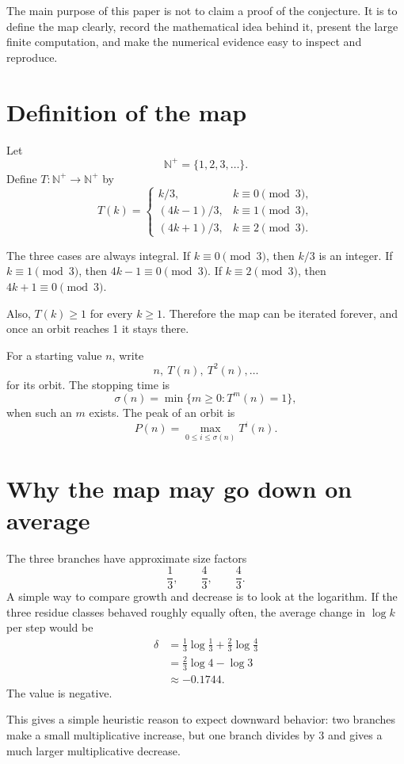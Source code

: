 \documentclass[11pt]{article}
\begin{document}
The main purpose of this paper is not to claim a proof of the conjecture. It is to define the map clearly, record the mathematical idea behind it, present the large finite computation, and make the numerical evidence easy to inspect and reproduce.

\section{Definition of the map}
Let
\[
\mathbb N^+=\{1,2,3,\ldots\}.
\]
Define $T:\mathbb N^+\to\mathbb N^+$ by
\begin{equation}
T(k)=
\begin{cases}
 k/3, & k\equiv0\pmod3,\\[3pt]
 (4k-1)/3, & k\equiv1\pmod3,\\[3pt]
 (4k+1)/3, & k\equiv2\pmod3.
\end{cases}
\label{eq:map}
\end{equation}

The three cases are always integral. If $k\equiv0\pmod3$, then $k/3$ is an integer. If $k\equiv1\pmod3$, then $4k-1\equiv0\pmod3$. If $k\equiv2\pmod3$, then $4k+1\equiv0\pmod3$.

Also, $T(k)\ge1$ for every $k\ge1$. Therefore the map can be iterated forever, and once an orbit reaches 1 it stays there.

For a starting value $n$, write
\[
n,\ T(n),\ T^2(n),\ldots
\]
for its orbit. The stopping time is
\[
\sigma(n)=\min\{m\ge0:T^m(n)=1\},
\]
when such an $m$ exists. The peak of an orbit is
\[
P(n)=\max_{0\le i\le\sigma(n)}T^i(n).
\]

\section{Why the map may go down on average}
The three branches have approximate size factors
\[
\frac13,\qquad \frac43,\qquad \frac43.
\]
A simple way to compare growth and decrease is to look at the logarithm. If the three residue classes behaved roughly equally often, the average change in $\log k$ per step would be
\begin{align}
\delta
&=\frac13\log\frac13+\frac23\log\frac43\\
&=\frac23\log4-\log3\\
&\approx-0.1744.
\end{align}
The value is negative.

This gives a simple heuristic reason to expect downward behavior: two branches make a small multiplicative increase, but one branch divides by 3 and gives a much larger multiplicative decrease.
\end{document}
